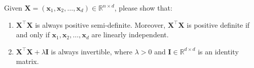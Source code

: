 \documentclass[11pt,letter,notitlepage]{article}
\begin{document}



\begin{exercise}
Given $\mathbf{X}=(\mathbf{x}_1, \mathbf{x}_2, \dots, \mathbf{x}_d)\in \mathbb{R}^{n\times d}$, please show that:
\begin{enumerate}
    \item $\mathbf{X}^{\top}\mathbf{X}$ is always positive semi-definite. Moreover, $\mathbf{X}^{\top}\mathbf{X}$ is positive definite if and only if $\mathbf{x}_1, \mathbf{x}_2, \dots, \mathbf{x}_d$ are linearly independent.
    \item $\mathbf{X}^{\top}\mathbf{X} + \lambda \mathbf{I}$ is always invertible, where $\lambda>0$ and $\mathbf{I}\in \mathbb{R}^{d\times d}$ is an identity matrix.  
\end{enumerate}


\end{exercise}
\end{document}
